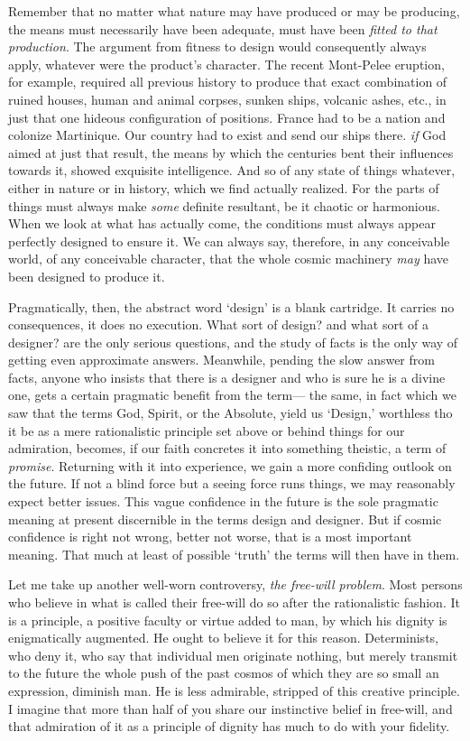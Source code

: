 \documentclass[]{article}
\begin{document}
Remember that no matter what nature may have produced or may be producing, the means must necessarily have been adequate, must have been \emph{fitted to that production}. The argument from fitness to design would consequently always apply, whatever were the product's character. The recent Mont-Pelee eruption, for example, required all previous history to produce that exact combination of ruined houses, human and animal corpses, sunken ships, volcanic ashes, etc., in just that one hideous configuration of positions. France had to be a nation and colonize Martinique. Our country had to exist and send our ships there. \emph{if} God aimed at just that result, the means by which the centuries bent their influences towards it, showed exquisite intelligence. And so of any state of things whatever, either in nature or in history, which we find actually realized. For the parts of things must always make \emph{some} definite resultant, be it chaotic or harmonious. When we look at what has actually come, the conditions must always appear perfectly designed to ensure it. We can always say, therefore, in any conceivable world, of any conceivable character, that the whole cosmic machinery \emph{may} have been designed to produce it.

Pragmatically, then, the abstract word `design' is a blank cartridge. It carries no consequences, it does no execution. What sort of design? and what sort of a designer? are the only serious questions, and the study of facts is the only way of getting even approximate answers. Meanwhile, pending the slow answer from facts, anyone who insists that there is a designer and who is sure he is a divine one, gets a certain pragmatic benefit from the term--- the same, in fact which we saw that the terms God, Spirit, or the Absolute, yield us `Design,' worthless tho it be as a mere rationalistic principle set above or behind things for our admiration, becomes, if our faith concretes it into something theistic, a term of \emph{promise}. Returning with it into experience, we gain a more confiding outlook on the future. If not a blind force but a seeing force runs things, we may reasonably expect better issues. This vague confidence in the future is the sole pragmatic meaning at present discernible in the terms design and designer. But if cosmic confidence is right not wrong, better not worse, that is a most important meaning. That much at least of possible `truth' the terms will then have in them.

Let me take up another well-worn controversy, \emph{the free-will problem}. Most persons who believe in what is called their free-will do so after the rationalistic fashion. It is a principle, a positive faculty or virtue added to man, by which his dignity is enigmatically augmented. He ought to believe it for this reason. Determinists, who deny it, who say that individual men originate nothing, but merely transmit to the future the whole push of the past cosmos of which they are so small an expression, diminish man. He is less admirable, stripped of this creative principle. I imagine that more than half of you share our instinctive belief in free-will, and that admiration of it as a principle of dignity has much to do with your fidelity.
\end{document}
